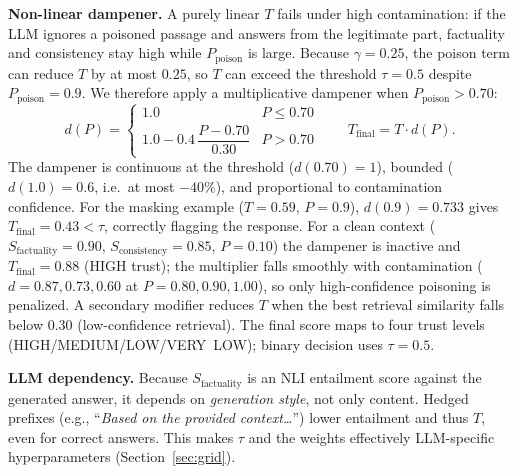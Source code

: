 \textbf{Non-linear dampener.} A purely linear $T$ fails under high contamination: if the LLM ignores a poisoned passage and answers from the legitimate part, factuality and consistency stay high while $P_{\text{poison}}$ is large. Because $\gamma{=}0.25$, the poison term can reduce $T$ by at most $0.25$, so $T$ can exceed the threshold $\tau{=}0.5$ despite $P_{\text{poison}} {=}0.9$. We therefore apply a multiplicative dampener when $P_{\text{poison}}>0.70$:
\begin{equation}
\label{eq:damp}
d(P) =
\begin{cases}
1.0 & P \le 0.70\\[2pt]
1.0 - 0.4\,\dfrac{P-0.70}{0.30} & P > 0.70
\end{cases}
\qquad T_{\text{final}} = T\cdot d(P).
\end{equation}
The dampener is continuous at the threshold ($d(0.70){=}1$), bounded ($d(1.0){=}0.6$, i.e.\ at most $-40\%$), and proportional to contamination confidence. For the masking example ($T{=}0.59$, $P{=}0.9$), $d(0.9){=}0.733$ gives $T_{\text{final}}{=}0.43<\tau$, correctly flagging the response. For a clean context ($S_{\text{factuality}}{=}0.90$, $S_{\text{consistency}}{=}0.85$, $P{=}0.10$) the dampener is inactive and $T_{\text{final}}{=}0.88$ (HIGH trust); the multiplier falls smoothly with contamination ($d{=}0.87, 0.73, 0.60$ at $P{=}0.80, 0.90, 1.00$), so only high-confidence poisoning is penalized. A secondary modifier reduces $T$ when the best retrieval similarity falls below $0.30$ (low-confidence retrieval). The final score maps to four trust levels (HIGH/MEDIUM/LOW/VERY~LOW); binary decision uses $\tau{=}0.5$.

\textbf{LLM dependency.} Because $S_{\text{factuality}}$ is an NLI entailment score against the generated answer, it depends on \emph{generation style}, not only content. Hedged prefixes (e.g., ``\emph{Based on the provided context\dots}'') lower entailment and thus $T$, even for correct answers. This makes $\tau$ and the weights effectively LLM-specific hyperparameters (Section~\ref{sec:grid}).
